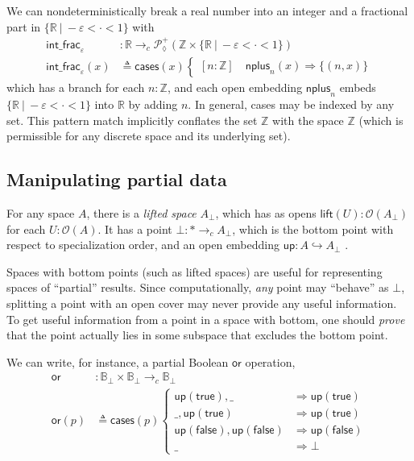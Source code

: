 \documentclass[conference]{IEEEtran}
\newcommand{\PLower}{\mathcal{P}_\lozenge}
\newcommand{\hookto}{\hookrightarrow}
\newcommand{\cto}{\to_c}
\newcommand{\R}{\mathbb{R}}
\newcommand{\Z}{\mathbb{Z}}
\newcommand{\suchthat}{\ |\ }
\newcommand{\One}{\ast}
\newcommand{\Open}[1]{\mathcal{O}({#1})}
\newcommand{\bool}{\mathbb{B}}
\newcommand{\wildcard}{\_}
\newcommand{\Branch}{\Rightarrow}
\newcommand{\up}{\mathsf{up}}
\newcommand{\btrue}{\mathsf{true}}
\newcommand{\bfalse}{\mathsf{false}}
\begin{document}
We can nondeterministically break a real number into an integer and a fractional part in $\{ \R \suchthat -\varepsilon < \cdot < 1 \}$ with
\begin{align*}
\mathsf{int\_frac}_\varepsilon &: \R \cto \PLower^+(\Z \times \{ \R \suchthat -\varepsilon < \cdot < 1 \})
\\ \mathsf{int\_frac}_\varepsilon(x) &\triangleq \mathsf{cases}(x)
\begin{cases}
[n : \Z] \quad \mathsf{nplus}_n(x) \Branch \{ (n, x) \}
\end{cases}
\end{align*}
which has a branch for each $n : \Z$, and each open embedding $\mathsf{nplus}_n$ embeds $\{ \R \suchthat -\varepsilon < \cdot < 1 \}$ into $\R$ by adding $n$. In general, cases may be indexed by any set. This pattern match implicitly conflates the set $\Z$ with the space $\Z$ (which is permissible for any discrete space and its underlying set).

\subsection{Manipulating partial data}
\label{s:ex:partial}

For any space $A$, there is a \emph{lifted space} $A_\bot$, which has as opens $\mathsf{lift}(U) : \Open{A_\bot}$ for each $U : \Open{A}$. It has a point $\bot : \One \cto A_\bot$, which is the bottom point with respect to specialization order, and an open embedding $ \up : A \hookto A_\bot$  \cite{topologyvialogic}.

Spaces with bottom points (such as lifted spaces) are useful for representing spaces of ``partial'' results. Since computationally, \emph{any} point may ``behave'' as $\bot$, splitting a point with an open cover may never provide any useful information. To get useful information from a point in a space with bottom, one should \emph{prove} that the point actually lies in some subspace that excludes the bottom point.

We can write, for instance, a partial Boolean $\mathsf{or}$ operation,
\begin{align*}
\mathsf{or} &: \bool_\bot \times \bool_\bot \cto \bool_\bot
\\ \mathsf{or}(p) &\triangleq \mathsf{cases}(p)
\begin{cases}
\up(\btrue), \wildcard &\Branch \up(\btrue)
\\ \wildcard, \up(\btrue) &\Branch \up(\btrue)
\\ \up(\bfalse), \up(\bfalse) &\Branch \up(\bfalse)
\\ \wildcard &\Branch \bot
\end{cases}
\end{align*}
\end{document}
